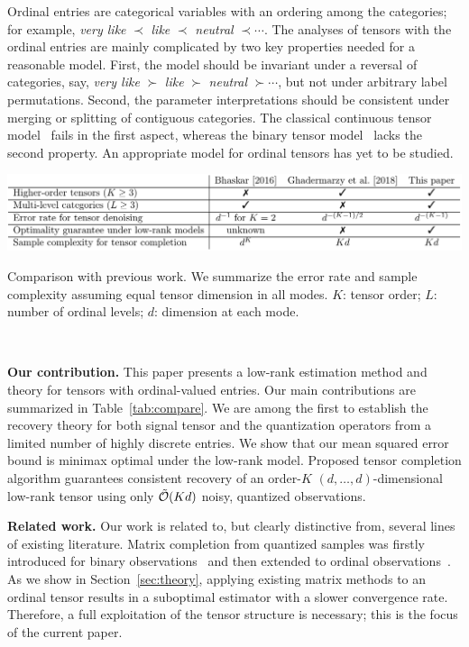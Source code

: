 \documentclass{article}
\theoremstyle{plain}
\theoremstyle{definition}
\begin{document}
 Ordinal entries are categorical variables with an ordering among the categories; for example, {\it very like} $\prec$ {\it like} $\prec$ {\it neutral} $\prec \cdots$. The analyses of tensors with the ordinal entries are mainly complicated by two key properties needed for a reasonable model. First, the model should be invariant under a reversal of categories, say, {\it very like} $\succ$ {\it like} $\succ$ {\it neutral} $\succ \cdots$, but not under arbitrary label permutations. Second, the parameter interpretations should be consistent under merging or splitting of contiguous categories. The classical continuous tensor model~\cite{kolda2009tensor, ghadermarzy2019near} fails in the first aspect, whereas the binary tensor model~\cite{ghadermarzy2018learning} lacks the second property. An appropriate model for ordinal tensors has yet to be studied.

\begin{table}[ht]
\centerline{\includegraphics[width=14.2cm]{compare.pdf}}
\vspace{-.3cm}
\caption{\footnotesize Comparison with previous work. We summarize the error rate and sample complexity assuming equal tensor dimension in all modes. $K$: tensor order; $L$: number of ordinal levels; $d$: dimension at each mode. }~\label{tab:compare}
\vspace{-.5cm}
\end{table}

{\bf Our contribution.} This paper presents a low-rank estimation method and theory for tensors with ordinal-valued entries. 
Our main contributions are summarized in Table~\ref{tab:compare}. %
We are among the first to establish the recovery theory for both signal tensor and the quantization operators from a limited number of highly discrete entries. We show that our mean squared error bound is minimax optimal under the low-rank model.  Proposed tensor completion algorithm guarantees consistent recovery of an order-$K$ $(d,\ldots,d)$-dimensional low-rank tensor using only $\tilde {\mathcal{O}}(Kd)$ noisy, quantized observations.

{\bf Related work.} Our work is related to, but clearly distinctive from, several lines of existing literature. Matrix completion from quantized samples was firstly introduced for binary observations~\cite{cai2013max,davenport2014,bhaskar20151} and then extended to ordinal observations~\cite{bhaskar2016probabilistic}. As we show in Section~\ref{sec:theory}, applying existing matrix methods to an ordinal tensor results in a suboptimal estimator with a slower convergence rate. Therefore, a full exploitation of the tensor structure is necessary; this is the focus of the current paper.
\end{document}
